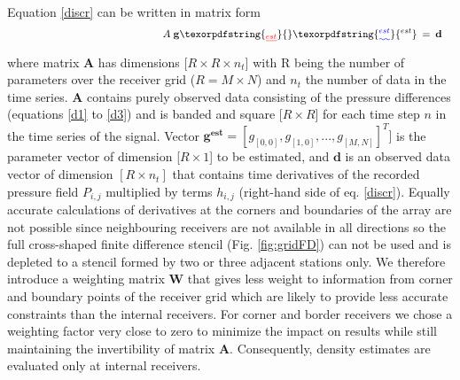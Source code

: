 \documentclass{article} %
\providecommand{\DIFaddtex}[1]{{\protect\color{blue}\uwave{#1}}} %
\providecommand{\DIFdeltex}[1]{{\protect\color{red}\sout{#1}}}                      %
\providecommand{\DIFaddbegin}{} %
\providecommand{\DIFaddend}{} %
\providecommand{\DIFdelbegin}{} %
\providecommand{\DIFdelend}{} %
\providecommand{\DIFadd}[1]{\texorpdfstring{\DIFaddtex{#1}}{#1}} %
\providecommand{\DIFdel}[1]{\texorpdfstring{\DIFdeltex{#1}}{}} %
\newcommand{\DIFscaledelfig}{0.5}
\newlength{\DIFdelgraphicswidth} %
\newlength{\DIFdelgraphicsheight} %
\newcommand{\DIFaddincludegraphics}[2][]{{\color{blue}\fbox{\DIFOincludegraphics[#1]{#2}}}} %
\newcommand{\DIFdelincludegraphics}[2][]{%
\sbox{\DIFdelgraphicsbox}{\DIFOincludegraphics[#1]{#2}}%
\settoboxwidth{\DIFdelgraphicswidth}{\DIFdelgraphicsbox} %
\settoboxtotalheight{\DIFdelgraphicsheight}{\DIFdelgraphicsbox} %
\scalebox{\DIFscaledelfig}{%
\parbox[b]{\DIFdelgraphicswidth}{\usebox{\DIFdelgraphicsbox}\\[-\baselineskip] \rule{\DIFdelgraphicswidth}{0em}}\llap{\resizebox{\DIFdelgraphicswidth}{\DIFdelgraphicsheight}{%
\setlength{\unitlength}{\DIFdelgraphicswidth}%
\begin{picture}(1,1)%
\thicklines\linethickness{2pt} %
{\color[rgb]{1,0,0}\put(0,0){\framebox(1,1){}}}%
{\color[rgb]{1,0,0}\put(0,0){\line( 1,1){1}}}%
{\color[rgb]{1,0,0}\put(0,1){\line(1,-1){1}}}%
\end{picture}%
}\hspace*{3pt}}} %
} %
\DeclareRobustCommand{\DIFaddbegin}{\DIFOaddbegin \let\includegraphics\DIFaddincludegraphics} %
\DeclareRobustCommand{\DIFaddend}{\DIFOaddend \let\includegraphics\DIFOincludegraphics} %
\DeclareRobustCommand{\DIFdelbegin}{\DIFOdelbegin \let\includegraphics\DIFdelincludegraphics} %
\DeclareRobustCommand{\DIFdelend}{\DIFOaddend \let\includegraphics\DIFOincludegraphics} %
\begin{document}
	Equation \eqref{discr} can be written in matrix form
	\begin{align}
	\shoveright \shoveright \shoveright \shoveright \shoveright \shoveright \shoveright \shoveright \shoveright \shoveright \shoveright \shoveright \shoveright \shoveright \shoveright
 			 \mathbf{A} \; \mathbf{g}\DIFdelbegin \DIFdel{_{est} }\DIFdelend \DIFaddbegin \DIFadd{^{est} }\DIFaddend &\: = \: \mathbf{d}
	\end{align}
	where matrix \textbf{A} has dimensions [$R \times R \times n_{t}$] with R being the number of parameters over the receiver grid ($R=M \times N$) and $n_{t}$ the number of data in the time series. \textbf{A} contains purely observed data consisting of the pressure differences (equations \ref{d1} to \ref{d3}) and is banded and square [$R \times R$] for each time step $n$ in the time series of the signal. Vector $ \mathbf{g^{est}} = [g_{[0,0]}, g_{[1,0]},..., g_{[M,N]}]^{T}]$ is the parameter vector of dimension [$R \times 1$] to be estimated, and $\mathbf{d}$ is an observed data vector of dimension $[R \times n_{t}]$ that contains time derivatives of the recorded pressure field $P_{i,j}$ multiplied by terms $h_{i,j}$ (right-hand side of eq. \ref{discr}). Equally accurate calculations of derivatives at the corners and boundaries of the array are not possible since neighbouring receivers are not available in all directions so the full cross-shaped finite difference stencil (Fig. \ref{fig:gridFD}) can not be used and is depleted to a stencil formed by two or three adjacent stations only. %
	We therefore introduce a weighting matrix $\mathbf{W}$ that gives less weight to information from corner and boundary points of the receiver grid which are likely to provide less accurate constraints than the internal receivers. For corner and border receivers we chose a weighting factor very close to zero to minimize the impact on results while still maintaining the invertibility of matrix $\mathbf{A}$. Consequently, density estimates are evaluated only at internal receivers. \\
\end{document}

